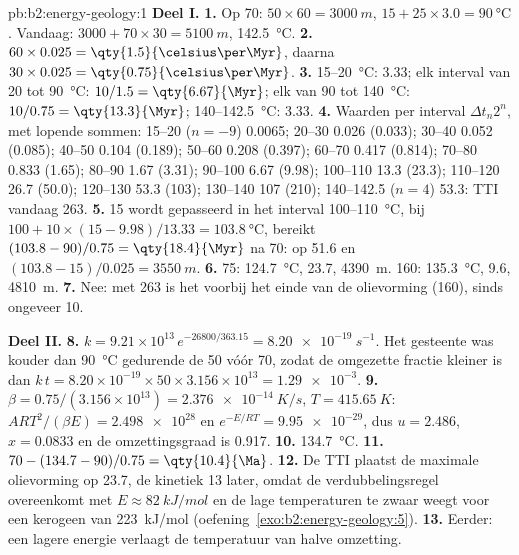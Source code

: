 \begin{solution}{pb:b2:energy-geology:1}
\noindent\textbf{Deel I.}
\textbf{1.} Op \qty{70}{\Ma}: $50 \times 60 = \qty{3000}{m}$, $15 + 25 \times 3.0 =
\qty{90}{\celsius}$. Vandaag: $3000 + 70 \times 30 = \qty{5100}{m}$, \qty{142.5}{\celsius}.
\textbf{2.} $60 \times 0.025 = \qty{1.5}{\celsius\per\Myr}$, daarna $30 \times 0.025 =
\qty{0.75}{\celsius\per\Myr}$.
\textbf{3.} 15--\qty{20}{\celsius}: \qty{3.33}{\Myr}; elk interval van 20 tot \qty{90}{\celsius}:
$10/1.5 = \qty{6.67}{\Myr}$; elk van 90 tot \qty{140}{\celsius}: $10/0.75 = \qty{13.3}{\Myr}$;
140--\qty{142.5}{\celsius}: \qty{3.33}{\Myr}.
\textbf{4.} Waarden per interval $\Delta t_n 2^n$, met lopende sommen: 15--20 ($n = -9$) 0.0065; 20--30
0.026 (0.033); 30--40 0.052 (0.085); 40--50 0.104 (0.189); 50--60 0.208 (0.397); 60--70 0.417
(0.814); 70--80 0.833 (1.65); 80--90 1.67 (3.31); 90--100 6.67 (9.98); 100--110 13.3 (23.3);
110--120 26.7 (50.0); 120--130 53.3 (103); 130--140 107 (210); 140--142.5 ($n = 4$) 53.3: TTI
vandaag 263.
\textbf{5.} 15 wordt gepasseerd in het interval 100--\qty{110}{\celsius}, bij $100 + 10 \times
(15 - 9.98)/13.33 = \qty{103.8}{\celsius}$, bereikt $(103.8 - 90)/0.75 = \qty{18.4}{\Myr}$ na
\qty{70}{\Ma}: op \qty{51.6}{\Ma} en $(103.8 - 15)/0.025 = \qty{3550}{m}$.
\textbf{6.} 75: \qty{124.7}{\celsius}, \qty{23.7}{\Ma}, \qty{4390}{m}. 160: \qty{135.3}{\celsius},
\qty{9.6}{\Ma}, \qty{4810}{m}.
\textbf{7.} Nee: met 263 is het voorbij het einde van de olievorming (160), sinds ongeveer \qty{10}{\Ma}.

\noindent\textbf{Deel II.}
\textbf{8.} $k = 9.21 \times 10^{13}\,e^{-26800/363.15} = \qty{8.20e-19}{s^{-1}}$. Het gesteente was
kouder dan \qty{90}{\celsius} gedurende de \qty{50}{\Myr} vóór \qty{70}{\Ma}, zodat de omgezette fractie
kleiner is dan $k\,t = 8.20 \times 10^{-19} \times 50 \times 3.156 \times 10^{13} = \num{1.29e-3}$.
\textbf{9.} $\beta = 0.75/(3.156 \times 10^{13}) = \qty{2.376e-14}{K/s}$, $T = \qty{415.65}{K}$:
$ART^2/(\beta E) = \num{2.498e28}$ en $e^{-E/RT} = \num{9.95e-29}$, dus $u = 2.486$, $x = 0.0833$ en
de omzettingsgraad is 0.917.
\textbf{10.} \qty{134.7}{\celsius}.
\textbf{11.} $70 - (134.7 - 90)/0.75 = \qty{10.4}{\Ma}$.
\textbf{12.} De TTI plaatst de maximale olievorming op \qty{23.7}{\Ma}, de kinetiek \qty{13}{\Myr} later,
omdat de verdubbelingsregel overeenkomt met $E \approx \qty{82}{kJ/mol}$ en de lage
temperaturen te zwaar weegt voor een kerogeen van \qty{223}{kJ/mol} (oefening~\ref{exo:b2:energy-geology:5}).
\textbf{13.} Eerder: een lagere energie verlaagt de temperatuur van halve omzetting.


\end{solution}

